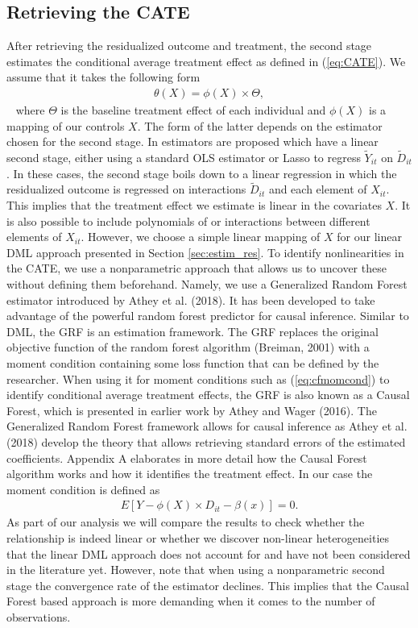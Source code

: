 \subsection{Retrieving the CATE}
After retrieving the residualized outcome and treatment, the second stage estimates the conditional average treatment effect as defined in (\ref{eq:CATE}). We assume that it takes the following form
\begin{align} 
    \theta(X)=\phi(X) \times \Theta, \label{eq:CATE}
\end{align} 
where $\Theta$ is the baseline treatment effect of each individual and $\phi(X)$ is a mapping of our controls $X$. The form of the latter depends on the estimator chosen for the second stage. In \cite{DML2017} estimators are proposed which have a linear second stage, either using a standard OLS estimator or Lasso to regress $\tilde{Y}_{it}$ on $\tilde{D}_{it}$. In these cases, the second stage boils down to a linear regression in which the residualized outcome is regressed on interactions $\tilde{D}_{it}$ and each element of $X_{it}$. This implies that the treatment effect we estimate is linear in the covariates $X$. It is also possible to include polynomials of or interactions between different elements of $X_{it}$. However, we choose a simple linear mapping of $X$ for our linear DML approach presented in Section \ref{sec:estim_res}. To identify nonlinearities in the CATE, we use a nonparametric approach that allows us to uncover these without defining them beforehand. Namely, we use a Generalized Random Forest estimator introduced by Athey et al. (2018). It has been developed to take advantage of the powerful random forest predictor for causal inference. Similar to DML, the GRF is an estimation framework. The GRF replaces the original objective function of the random forest algorithm (Breiman, 2001) with a moment condition containing some loss function that can be defined by the researcher. When using it for moment conditions such as (\ref{eq:cfmomcond}) to identify conditional average treatment effects, the GRF is also known as a Causal Forest, which is presented in earlier work by Athey and Wager (2016). The Generalized Random Forest framework allows for causal inference as Athey et al. (2018) develop the theory that allows retrieving standard errors of the estimated coefficients. Appendix A elaborates in more detail how the Causal Forest algorithm works and how it identifies the treatment effect. In our case the moment condition is defined as 
\begin{align}
    E \left[Y- \phi(X) \times D_{it} - \beta(x) \right] = 0. \label{eq:cfmomcond}
\end{align}
As part of our analysis we will compare the results to check whether the relationship is indeed linear or whether we discover non-linear heterogeneities that the linear DML approach does not account for and have not been considered in the literature yet. However, note that when using a nonparametric second stage the convergence rate of the estimator declines. This implies that the Causal Forest based approach is more demanding when it comes to the number of observations. 

